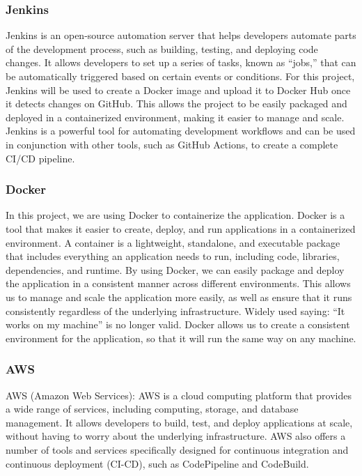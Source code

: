 \documentclass[
  10pt,
  paper=a4,
  ,captions=tableheading
]{scrartcl}
\begin{document}
\hypertarget{jenkins}{%
\subsubsection{Jenkins}\label{jenkins}}

Jenkins is an open-source automation server that helps developers
automate parts of the development process, such as building, testing,
and deploying code changes. It allows developers to set up a series of
tasks, known as ``jobs,'' that can be automatically triggered based on
certain events or conditions. For this project, Jenkins will be used to
create a Docker image and upload it to Docker Hub once it detects
changes on GitHub. This allows the project to be easily packaged and
deployed in a containerized environment, making it easier to manage and
scale. Jenkins is a powerful tool for automating development workflows
and can be used in conjunction with other tools, such as GitHub Actions,
to create a complete CI/CD pipeline.

\hypertarget{docker}{%
\subsubsection{Docker}\label{docker}}

In this project, we are using Docker to containerize the application.
Docker is a tool that makes it easier to create, deploy, and run
applications in a containerized environment. A container is a
lightweight, standalone, and executable package that includes everything
an application needs to run, including code, libraries, dependencies,
and runtime. By using Docker, we can easily package and deploy the
application in a consistent manner across different environments. This
allows us to manage and scale the application more easily, as well as
ensure that it runs consistently regardless of the underlying
infrastructure. Widely used saying: ``It works on my machine'' is no
longer valid. Docker allows us to create a consistent environment for
the application, so that it will run the same way on any machine.

\hypertarget{aws}{%
\subsubsection{AWS}\label{aws}}

AWS (Amazon Web Services): AWS is a cloud computing platform that
provides a wide range of services, including computing, storage, and
database management. It allows developers to build, test, and deploy
applications at scale, without having to worry about the underlying
infrastructure. AWS also offers a number of tools and services
specifically designed for continuous integration and continuous
deployment (CI-CD), such as CodePipeline and CodeBuild.
\end{document}
